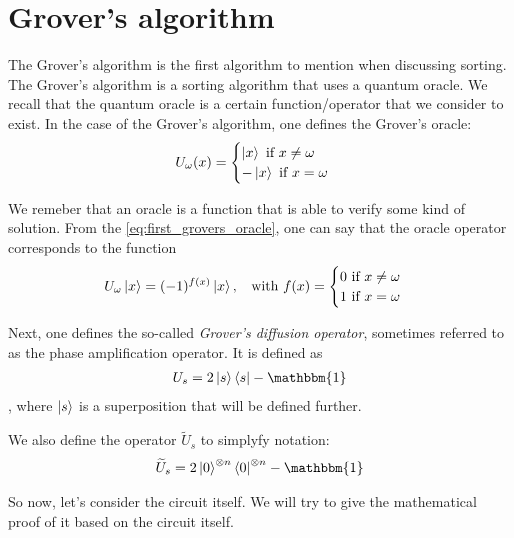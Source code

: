 \section{Grover's algorithm}
The Grover's algorithm is the first algorithm to mention when discussing sorting. 
The Grover's algorithm is a sorting algorithm that uses a quantum oracle.
We recall that the quantum oracle is a certain function/operator that we consider 
to exist.
In the case of the Grover's algorithm, one defines the Grover's oracle:
\begin{equation}
  U_\omega (x) = 
  \begin{cases}
    \ket{x} \text{ if } x \neq \omega\\
    -\ket{x} \text{ if } x = \omega
  \end{cases}
  \label{eq:first_grovers_oracle}
\end{equation}

We remeber that an oracle is a function that is able to verify some kind of solution.
From the \autoref{eq:first_grovers_oracle}, one can say that the oracle operator corresponds 
to the function
\begin{equation}
  U_\omega\ket{x} = (-1)^{f(x)}\ket{x}, \;\; \text{ with } 
  f(x) = \begin{cases}
    0 \text{ if } x \neq \omega \\
    1 \text{ if } x = \omega
  \end{cases}
  \label{eq:grovers_algorithm}
\end{equation}

Next, one defines the so-called \textsl{Grover's diffusion operator}, sometimes referred to as the 
phase amplification operator. It is defined as 
\begin{gather}
  U_s = 2\ket{s}\bra{s} - \mathbbm{1}
  \label{eq:grovers_diffusion}
\end{gather}
, where $\ket{s}$ is a superposition that will be defined further.

We also define the operator $\widetilde{U}_s$ to simplyfy notation:
\begin{gather}
\widetilde{U}_s = 2\ket{0}^{\otimes n}\bra{0}^{\otimes n} - \mathbbm{1}
\end{gather}

So now, let's consider the circuit itself. We will try to give the mathematical proof of it based on the circuit itself.

